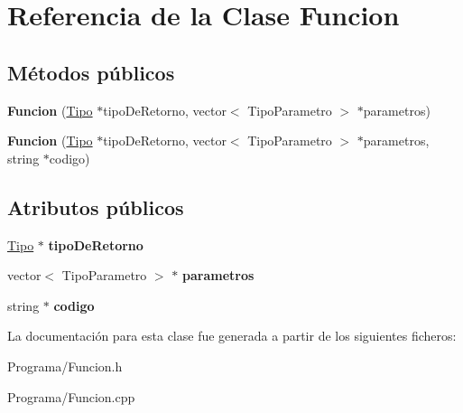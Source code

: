 \hypertarget{class_funcion}{\section{Referencia de la Clase Funcion}
\label{class_funcion}
}
\subsection*{Métodos públicos}
\begin{DoxyCompactItemize}
\item 
\hypertarget{class_funcion_a01b8d581259b1f982c25c3e734a2188d}{{\bfseries Funcion} (\hyperlink{class_tipo}{Tipo} $\ast$tipo\-De\-Retorno, vector$<$ Tipo\-Parametro $>$ $\ast$parametros)}\label{class_funcion_a01b8d581259b1f982c25c3e734a2188d}

\item 
\hypertarget{class_funcion_a1912c4a74bfed025ebb6e78c26532709}{{\bfseries Funcion} (\hyperlink{class_tipo}{Tipo} $\ast$tipo\-De\-Retorno, vector$<$ Tipo\-Parametro $>$ $\ast$parametros, string $\ast$codigo)}\label{class_funcion_a1912c4a74bfed025ebb6e78c26532709}

\end{DoxyCompactItemize}
\subsection*{Atributos públicos}
\begin{DoxyCompactItemize}
\item 
\hypertarget{class_funcion_aaaa7553fc7b60f80a86e321e36854968}{\hyperlink{class_tipo}{Tipo} $\ast$ {\bfseries tipo\-De\-Retorno}}\label{class_funcion_aaaa7553fc7b60f80a86e321e36854968}

\item 
\hypertarget{class_funcion_aa7139ebb9c92733298382ab128ae9b00}{vector$<$ Tipo\-Parametro $>$ $\ast$ {\bfseries parametros}}\label{class_funcion_aa7139ebb9c92733298382ab128ae9b00}

\item 
\hypertarget{class_funcion_aabc2121cdc6c8907b279c85671689b22}{string $\ast$ {\bfseries codigo}}\label{class_funcion_aabc2121cdc6c8907b279c85671689b22}

\end{DoxyCompactItemize}


La documentación para esta clase fue generada a partir de los siguientes ficheros\-:\begin{DoxyCompactItemize}
\item 
Programa/Funcion.\-h\item 
Programa/Funcion.\-cpp\end{DoxyCompactItemize}
